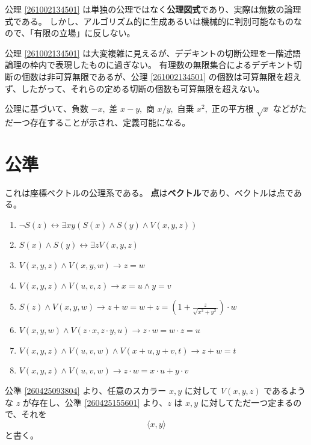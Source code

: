 公理 \ref{261002134501} は単独の公理ではなく\textbf{公理図式}であり、実際は無数の論理式である。
しかし、アルゴリズム的に生成あるいは機械的に判別可能なものなので、「有限の立場」に反しない。

公理 \ref{261002134501} は大変複雑に見えるが、デデキントの切断公理を一階述語論理の枠内で表現したものに過ぎない。
有理数の無限集合によるデデキント切断の個数は非可算無限であるが、公理 \ref{261002134501} の個数は可算無限を超えず、したがって、それらの定める切断の個数も可算無限を超えない。

公理に基づいて、負数 \(-x,\) 差 \(x-y,\) 商 \(x/y,\) 自乗 \(x^2,\) 正の平方根 \(\sqrt{x}\) などがただ一つ存在することが示され、定義可能になる。



\section{公準}\label{261010071201}

これは座標ベクトルの公理系である。
\textbf{点}は\textbf{ベクトル}であり、ベクトルは点である。

\begin{enumerate}
  \item \(\lnot S(z)\leftrightarrow\exists xy(S(x)\land S(y)\land V(x,y,z))\)
  \item\label{260425093804} \(S(x)\land S(y)\leftrightarrow \exists zV(x,y,z)\)
  \item\label{260425155601} \(V(x,y,z)\land V(x,y,w)\rightarrow z=w\)
  \item \(V(x,y,z)\land V(u,v,z)\rightarrow x=u\land y=v\)
  \item\label{260425093803} \(\displaystyle S(z)\land V(x,y,w)\rightarrow z+w=w+z=\left(1+\frac{z}{\sqrt{x^2+y^2}}\right)\cdot w\)
  \item \(V(x,y,w)\land V(z\cdot x,z\cdot y,u)\rightarrow z\cdot w=w\cdot z=u\)
  \item \(V(x,y,z)\land V(u,v,w)\land V(x+u,y+v,t)\rightarrow z+w=t\)
  \item \(V(x,y,z)\land V(u,v,w)\rightarrow z\cdot w=x\cdot u+y\cdot v\)
\end{enumerate}


\begin{dfn}\label{260419033901}
  公準 \ref{260425093804} より、任意のスカラー \(x,y\) に対して \(V(x,y,z)\) であるような \(z\) が存在し、公準 \ref{260425155601} より、\(z\) は \(x,y\) に対してただ一つ定まるので、それを
  \[\langle x,y\rangle\]
  と書く。
\end{dfn}

